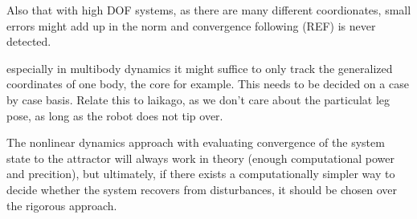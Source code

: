   Also that with high DOF systems, as there are many different coordionates, small errors might add up in the norm and convergence following (REF) is never detected. 

especially in multibody dynamics it might suffice to only track the generalized coordinates of one body, the core for example. This needs to be decided on a case by case basis. 
Relate this to laikago, as we don't care about the particulat leg pose, as long as the robot does not tip over. 

The nonlinear dynamics approach with evaluating convergence of the system state to the attractor will always work in theory (enough computational power and precition), but ultimately, if there exists a computationally simpler way to decide whether the system recovers from disturbances, it should be chosen over the rigorous approach. 
 

    
    

    






